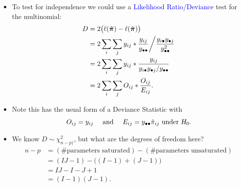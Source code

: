 \documentclass[oneside]{book}\usepackage[]{graphicx}\usepackage[svgnames]{xcolor}
\let\log\relax%
\newcommand{\HN}{\textsl{H}_{\textsl{0}}}%
\providecommand{\Vector}[1]{\bm{#1}}%
\begin{document}
\begin{itemize}
      \item To test for independence we could use a \textcolor{Blue}{Likelihood Ratio/Deviance} test for the
            multinomial:
            \begin{align*}
                  D
                   & =2\bigl(\ell(\tilde{\Vector{\pi}})-\ell(\hat{\Vector{\pi}})\bigr)                                                             \\
                   & =2\sum_i\sum_j y_{ij}\log*{\frac{y_{ij}}{y_{\bullet\bullet}}\bigg/\frac{y_{i \bullet} y_{\bullet j}}{y_{\bullet\bullet}^{2}}} \\
                   & =2\sum_i\sum_j y_{ij}\log*{\frac{y_{ij}}{y_{i\bullet}y_{\bullet j}/y_{\bullet\bullet}}}                                       \\
                   & =2\sum_i\sum_j O_{ij}\log*{\frac{O_{ij}}{E_{ij}}}.
            \end{align*}
      \item Note this has the usual form of a Deviance Statistic with
            \[ O_{ij}=y_{ij}\quad\text{ and }\quad E_{ij}=y_{\bullet\bullet}\hat{\pi}_{ij}\text{ under $ \HN $}. \]
      \item We know $ D \sim \chi^2_{n-p)} $, but what are the degrees of freedom here?
            \begin{align*}
                  n-p
                   & =(\text{\# parameters saturated})-(\text{\# parameters unsaturated}) \\
                   & =(IJ-1)-\bigl((I-1)+(J-1)\bigr)                                      \\
                   & =IJ-I-J+1                                                            \\
                   & =(I-1)(J-1).
            \end{align*}
\end{itemize}
\end{document}
